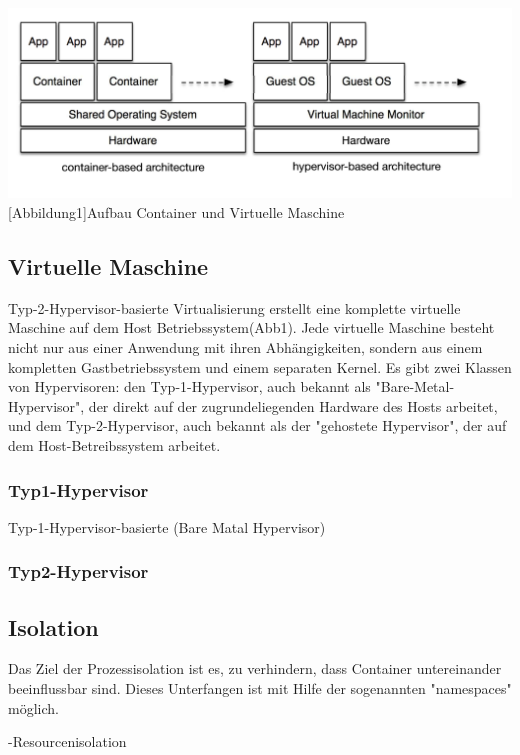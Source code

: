 \documentclass[12pt,a4paper,bibliography=totocnumbered,listof=totocnumbered]{scrartcl}
\begin{document}
\vspace{1em}
\begin{minipage}{\linewidth}
	\centering
	\includegraphics[width=1\linewidth]{pics/docker2.png}
	[Abbildung1]{Aufbau Container und Virtuelle Maschine \cite{Xavier2015AClouds}}
	\label{fig:reversi2}
\end{minipage}


\subsection{Virtuelle Maschine}
Typ-2-Hypervisor-basierte Virtualisierung erstellt eine komplette virtuelle Maschine auf dem Host Betriebssystem(Abb1). Jede virtuelle Maschine besteht nicht nur aus einer Anwendung mit ihren Abhängigkeiten, sondern aus einem kompletten Gastbetriebssystem und einem separaten Kernel. Es gibt zwei Klassen von Hypervisoren: den Typ-1-Hypervisor, auch bekannt als "Bare-Metal-Hypervisor", der direkt auf der zugrundeliegenden Hardware des Hosts arbeitet, und dem Typ-2-Hypervisor, auch bekannt als der "gehostete Hypervisor", der auf dem Host-Betreibssystem arbeitet.

\subsubsection{Typ1-Hypervisor}
Typ-1-Hypervisor-basierte (Bare Matal Hypervisor)
\subsubsection{Typ2-Hypervisor}


\subsection{Isolation}
Das Ziel der Prozessisolation ist es, zu verhindern, dass Container untereinander beeinflussbar sind. Dieses Unterfangen ist mit Hilfe der sogenannten "namespaces" möglich. 

-Resourcenisolation 
\end{document}
